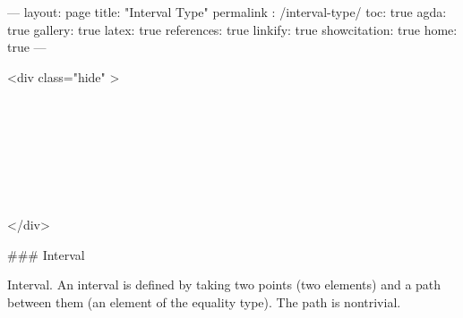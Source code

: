 ---
layout: page
title: "Interval Type"
permalink : /interval-type/
toc: true
agda: true
gallery: true
latex: true
references: true
linkify: true
showcitation: true
home: true
---

<div class="hide" >
\begin{code}%
\>[0]\AgdaSymbol{\{-\#}\AgdaSpace{}%
\AgdaSpace{}%
\AgdaSpace{}%
\AgdaSymbol{\#-\}}\<%
\\
\>[0]\AgdaSpace{}%
\AgdaSpace{}%
\<%
\\
\>[0]\AgdaSpace{}%
\AgdaSpace{}%
\<%
\\
%
\\[\AgdaEmptyExtraSkip]%
\>[0]\AgdaSpace{}%
\AgdaSpace{}%
\<%
\\
\>[0]\AgdaSpace{}%
\AgdaSpace{}%
\<%
\\
\>[0]\AgdaSpace{}%
\AgdaSpace{}%
\<%
\end{code}
</div>

### Interval

Interval. An interval is defined by taking two points (two elements) and a path
between them (an element of the equality type). The path is nontrivial.

